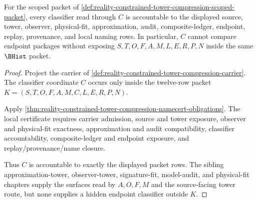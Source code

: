 \begin{theorem}
\label{thm:reality-constrained-tower-compression-classifier-accountability}
For the scoped packet of \autoref{def:reality-constrained-tower-compression-scoped-packet}, every classifier read through $C$ is accountable to the displayed source, tower, observer, physical-fit, approximation, audit, composite-ledger, endpoint, replay, provenance, and local naming rows. In particular, $C$ cannot compare endpoint packages without exposing $S,T,O,F,A,M,L,E,R,P,N$ inside the same $\BHist$ packet.
\end{theorem}
\begin{proof}
Project the carrier of \autoref{def:reality-constrained-tower-compression-carrier}. The classifier coordinate $C$ occurs only inside the twelve-row packet $K=(S,T,O,F,A,M,C,L,E,R,P,N)$.

Apply \autoref{thm:reality-constrained-tower-compression-namecert-obligations}. The local certificate requires carrier admission, source and tower exposure, observer and physical-fit exactness, approximation and audit compatibility, classifier accountability, composite-ledger and endpoint exposure, and replay/provenance/name closure.

Thus $C$ is accountable to exactly the displayed packet rows. The sibling approximation-tower, observer-tower, signature-fit, model-audit, and physical-fit chapters supply the surfaces read by $A,O,F,M$ and the source-facing tower route, but none supplies a hidden endpoint classifier outside $K$.
\end{proof}

